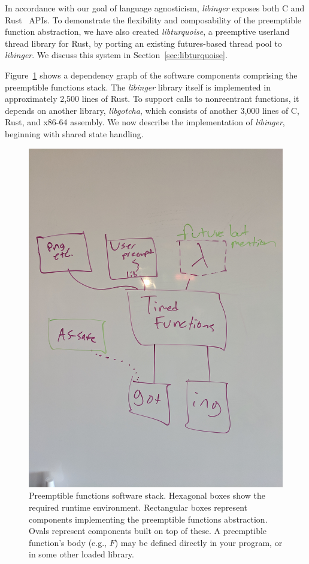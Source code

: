 In accordance with our goal of language agnosticism, \textit{libinger} exposes both C
and Rust~\cite{www-rustlang} APIs.  To demonstrate the flexibility and composability
of the preemptible function abstraction, we have also created \textit{libturquoise},
a preemptive userland thread library for Rust, by porting an existing futures-based
thread
pool to \textit{libinger}.  We discuss this system in Section~\ref{sec:libturquoise}.

Figure~\ref{fig:architecture} shows a dependency graph of the software components
comprising the preemptible functions stack.  The \textit{libinger} library itself is
implemented in approximately 2,500 lines of Rust.  To support calls to nonreentrant
functions, it depends on another library, \textit{libgotcha}, which consists of
another 3,000 lines of C, Rust, and x86-64 assembly.  We now describe the
implementation of \textit{libinger}, beginning with shared state handling.

\begin{figure}
\begin{center}
\includegraphics[width=\columnwidth]{figs/architecture}
\end{center}
\caption{Preemptible functions software stack.  \textnormal{Hexagonal boxes show
the required runtime environment.  Rectangular boxes represent components
implementing the preemptible functions abstraction.  Ovals represent components built
on top of these.  A preemptible function's body (e.g., $F$) may be defined directly in
your program, or in some other loaded library.}}
\label{fig:architecture}
\end{figure}

